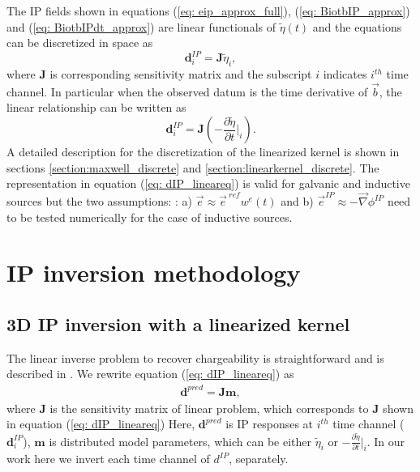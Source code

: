 \documentclass[a4paper, 11pt]{article}
\newcommand{\grad}{\vec \nabla}
\renewcommand {\b}  { {\vec b} }
\newcommand {\e}  { {\vec e} }
\newcommand{\peta}{\tilde{\eta}}
\newcommand{\eref}{\e^{\ ref}}
\begin{document}
The IP fields shown in equations (\ref{eq: eip_approx_full}), (\ref{eq: BiotbIP_approx}) and (\ref{eq: BiotbIPdt_approx}) are linear functionals of $\peta(t)$ and  the equations can be discretized in space as
\begin{equation}
  \mathbf{d}^{IP}_i = \mathbf{J}\peta_i,
  \label{eq: dIP_lineareq}
\end{equation}
where $\mathbf{J}$ is corresponding sensitivity matrix and the subscript $i$ indicates $i^{th}$ time channel. 
In particular when the observed datum is the time derivative of $\b$, the linear relationship can be written as 
\begin{equation}
  \mathbf{d}^{IP}_i = \mathbf{J}(-\frac{\partial \peta}{\partial t}\Big|_i).
  \label{eq: dIP_lineareq_dbdt}
\end{equation}
A detailed description for the discretization of the linearized kernel is shown in sections \ref{section:maxwell_discrete} and \ref{section:linearkernel_discrete}. 
The representation in equation (\ref{eq: dIP_lineareq}) is valid for galvanic and inductive sources but the two assumptions: : a) $\e \approx \eref w^e(t)$ and b) $\e^{IP} \approx -\grad\phi^{IP}$ need to be tested numerically for the case of inductive sources. 


\section{IP inversion methodology}

\subsection{3D IP inversion with a linearized kernel}
The linear inverse problem to recover chargeability is straightforward and is described in \cite{doug1994}. 
We rewrite equation (\ref{eq: dIP_lineareq}) as
\begin{eqnarray}
  \mathbf{d}^{pred} = \mathbf{J}\mathbf{m},
  \label{eq9}
\end{eqnarray}
where $\mathbf{J}$ is the  sensitivity matrix of linear problem, which corresponds to $\mathbf{J}$ shown in equation (\ref{eq: dIP_lineareq}) 
Here, $\mathbf{d}^{pred}$ is IP responses at $i^{th}$ time channel ($\mathbf{d}^{IP}_i$), $\mathbf{m}$ is distributed model parameters, which can be either $\peta_{i}$ or $-\frac{\partial \peta}{\partial t}\big|_i$. 
In our work here we invert each time channel of $d^{IP}$, separately. 
\end{document}
